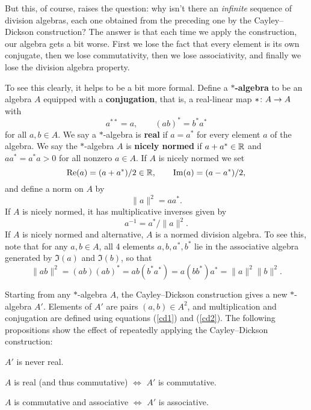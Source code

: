 But this, of course, raises the question: why isn't there an {\it
infinite} sequence of division algebras, each one obtained from the
preceding one by the Cayley--Dickson construction?  The answer is that
each time we apply the construction, our algebra gets a bit worse.
First we lose the fact that every element is its own conjugate, then we
lose commutativity, then we lose associativity, and finally we lose the
division algebra property.
   
To see this clearly, it helps to be a bit more formal.  Define a {\bf   
$\ast$-algebra} to be an algebra $A$ equipped with a {\bf conjugation},   
that is, a real-linear map $\ast \colon A \to A$ with   
\[            a^{**} = a, \quad \quad (ab)^* = b^* a^*  \]   
for all $a,b \in A$.  We say a $\ast$-algebra is {\bf real} if  $a =   
a^*$ for every element $a$ of the algebra.  We say the $\ast$-algebra   
$A$ is {\bf nicely normed} if $a + a^* \in {\mathbb R}$ and $aa^* = a^* a > 0$ 
for all nonzero $a \in A$.  If $A$ is nicely normed we set   
\[             {\rm Re}(a) = (a + a^\ast)/2  \in {\mathbb R}, \qquad   
               {\rm Im}(a) = (a - a^\ast)/2 ,  \]   
and define a norm on $A$ by    
\[                 \|a\|^2 = aa^\ast .      \]   
If $A$ is nicely normed, it has multiplicative inverses given by   
\[               a^{-1} = a^\ast / \|a\|^2   .\]   
If $A$ is nicely normed and alternative, $A$ is a normed division   
algebra.  To see this, note that for any $a,b \in A$, all 4 elements   
$a,b,a^\ast,b^\ast$ lie in the associative algebra generated by $\Im(a)$   
and $\Im(b)$, so that    
\[     \|ab\|^2 = (ab)(ab)^\ast = ab(b^\ast a^\ast) =    
a(bb^\ast)a^\ast = \|a\|^2 \|b\|^2 . \]   
   
Starting from any $\ast$-algebra $A$, the Cayley--Dickson construction   
gives a new $\ast$-algebra $A'$.   Elements of $A'$ are pairs $(a,b) \in   
A^2$, and multiplication and conjugation are defined using equations   
(\ref{cd1}) and (\ref{cd2}).   The following propositions show the   
effect of repeatedly applying the Cayley--Dickson construction:   
   
\begin{prop} \et \label{CD1}   
$A'$ is never real.     
\end{prop}   
   
\begin{prop} \et \label{CD2}   
$A$ is real (and thus commutative) $\iff$ $A'$ is commutative.   
\end{prop}     
   
\begin{prop} \et \label{CD3}   
$A$ is commutative and associative $\iff$ $A'$ is associative.    
\end{prop}   
   
